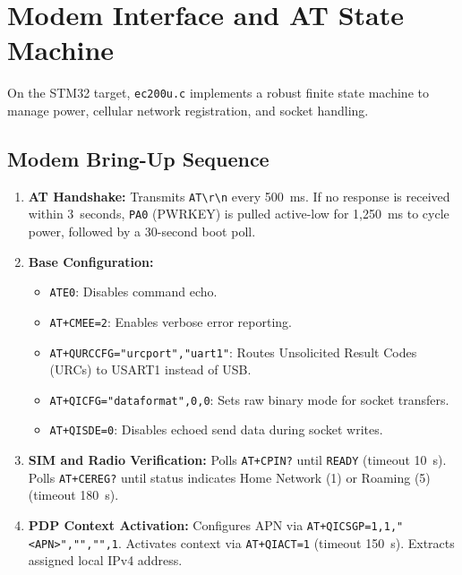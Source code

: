\documentclass[11pt,a4paper]{article}
\newcommand{\code}[1]{\texttt{#1}}
\begin{document}
\section{Modem Interface and AT State Machine}

On the STM32 target, \code{ec200u.c} implements a robust finite state machine to manage power, cellular network registration, and socket handling.

\subsection{Modem Bring-Up Sequence}
\begin{enumerate}
  \item \textbf{AT Handshake:} Transmits \code{AT\textbackslash r\textbackslash n} every 500~ms. If no response is received within 3~seconds, \code{PA0} (PWRKEY) is pulled active-low for 1,250~ms to cycle power, followed by a 30-second boot poll.
  \item \textbf{Base Configuration:}
    \begin{itemize}
      \item \code{ATE0}: Disables command echo.
      \item \code{AT+CMEE=2}: Enables verbose error reporting.
      \item \code{AT+QURCCFG="urcport","uart1"}: Routes Unsolicited Result Codes (URCs) to USART1 instead of USB.
      \item \code{AT+QICFG="dataformat",0,0}: Sets raw binary mode for socket transfers.
      \item \code{AT+QISDE=0}: Disables echoed send data during socket writes.
    \end{itemize}
  \item \textbf{SIM and Radio Verification:} Polls \code{AT+CPIN?} until \code{READY} (timeout 10~s). Polls \code{AT+CEREG?} until status indicates Home Network (1) or Roaming (5) (timeout 180~s).
  \item \textbf{PDP Context Activation:} Configures APN via \code{AT+QICSGP=1,1,"<APN>","","",1}. Activates context via \code{AT+QIACT=1} (timeout 150~s). Extracts assigned local IPv4 address.
\end{enumerate}
\end{document}
